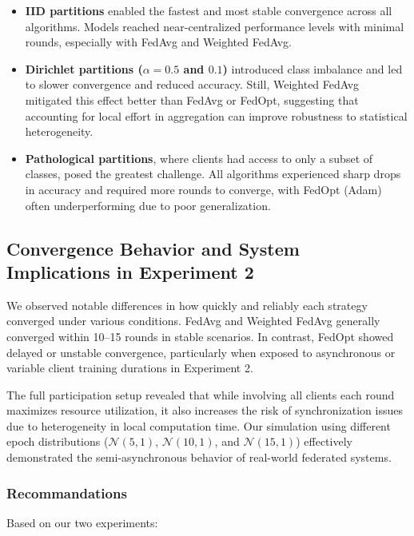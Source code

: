 \documentclass[11pt]{article}
\begin{document}
    \begin{itemize}
        \item \textbf{IID partitions} enabled the fastest and most stable convergence across all algorithms. Models reached near-centralized performance levels with minimal rounds, especially with FedAvg and Weighted FedAvg.

        \item \textbf{Dirichlet partitions ($\alpha = 0.5$ and $0.1$)} introduced class imbalance and led to slower convergence and reduced accuracy. Still, Weighted FedAvg mitigated this effect better than FedAvg or FedOpt, suggesting that accounting for local effort in aggregation can improve robustness to statistical heterogeneity.

        \item \textbf{Pathological partitions}, where clients had access to only a subset of classes, posed the greatest challenge. All algorithms experienced sharp drops in accuracy and required more rounds to converge, with FedOpt (Adam) often underperforming due to poor generalization.
    \end{itemize}

    \subsection{Convergence Behavior and System Implications in Experiment 2}

    We observed notable differences in how quickly and reliably each strategy converged under various conditions. FedAvg and Weighted FedAvg generally converged within 10–15 rounds in stable scenarios. In contrast, FedOpt showed delayed or unstable convergence, particularly when exposed to asynchronous or variable client training durations in Experiment 2.

    The full participation setup revealed that while involving all clients each round maximizes resource utilization, it also increases the risk of synchronization issues due to heterogeneity in local computation time. Our simulation using different epoch distributions (\(\mathcal{N}(5,1)\), \(\mathcal{N}(10,1)\), and \(\mathcal{N}(15,1)\)) effectively demonstrated the semi-asynchronous behavior of real-world federated systems.

    \subsubsection{Recommandations}
    Based on our two experiments:
\end{document}

